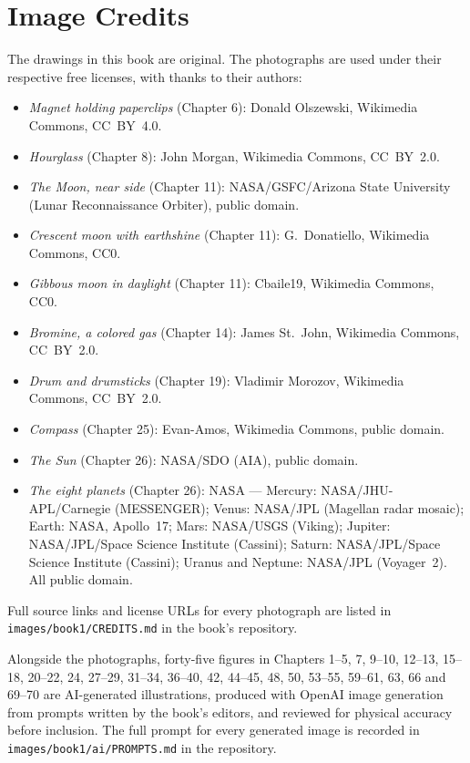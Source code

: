 \chapter*{Image Credits}

The drawings in this book are original. The photographs are used
under their respective free licenses, with thanks to their authors:

\begin{itemize}
  \item \emph{Magnet holding paperclips} (Chapter 6): Donald
        Olszewski, Wikimedia Commons, CC~BY~4.0.
  \item \emph{Hourglass} (Chapter 8): John Morgan, Wikimedia
        Commons, CC~BY~2.0.
  \item \emph{The Moon, near side} (Chapter 11): NASA/GSFC/Arizona
        State University (Lunar Reconnaissance Orbiter), public
        domain.
  \item \emph{Crescent moon with earthshine} (Chapter 11):
        G.~Donatiello, Wikimedia Commons, CC0.
  \item \emph{Gibbous moon in daylight} (Chapter 11): Cbaile19,
        Wikimedia Commons, CC0.
  \item \emph{Bromine, a colored gas} (Chapter 14): James
        St.~John, Wikimedia Commons, CC~BY~2.0.
  \item \emph{Drum and drumsticks} (Chapter 19): Vladimir Morozov,
        Wikimedia Commons, CC~BY~2.0.
  \item \emph{Compass} (Chapter 25): Evan-Amos, Wikimedia Commons,
        public domain.
  \item \emph{The Sun} (Chapter 26): NASA/SDO (AIA), public
        domain.
  \item \emph{The eight planets} (Chapter 26): NASA ---
        Mercury: NASA/JHU-APL/Carnegie (MESSENGER); Venus:
        NASA/JPL (Magellan radar mosaic); Earth: NASA, Apollo~17;
        Mars: NASA/USGS (Viking); Jupiter: NASA/JPL/Space Science
        Institute (Cassini); Saturn: NASA/JPL/Space Science
        Institute (Cassini); Uranus and Neptune: NASA/JPL
        (Voyager~2). All public domain.
\end{itemize}

Full source links and license URLs for every photograph are listed
in \texttt{images/book1/CREDITS.md} in the book's repository.

\bigskip
Alongside the photographs, forty-five figures in Chapters 1--5, 7,
9--10, 12--13, 15--18, 20--22, 24, 27--29, 31--34, 36--40, 42,
44--45, 48, 50, 53--55, 59--61, 63, 66 and 69--70 are AI-generated
illustrations, produced with OpenAI image generation from prompts
written by the book's editors, and reviewed for physical accuracy
before inclusion. The full prompt for every generated image is
recorded in \texttt{images/book1/ai/PROMPTS.md} in the repository.
\clearpage
